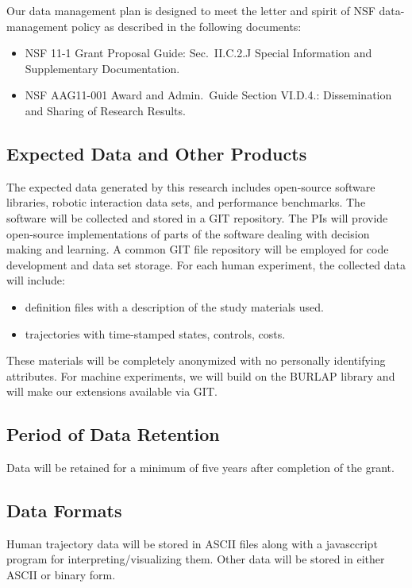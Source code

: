 Our data management plan is designed to meet the letter and spirit of
NSF data-management policy as described in the following documents:
\begin{itemize}
\item NSF 11-1 Grant Proposal Guide: Sec.\ II.C.2.J Special Information
   and Supplementary Documentation.
\item NSF AAG11-001 Award and Admin.\ Guide Section VI.D.4.: Dissemination
   and Sharing of Research Results.
\end{itemize}

\subsection*{Expected Data and Other Products}

The expected data generated by this research includes open-source
software libraries, robotic interaction data sets, and
performance benchmarks. The software will be collected and stored in a
GIT repository.  The PIs will provide open-source implementations of
parts of the software dealing with decision making and learning.
A common GIT file repository will be employed for code development and
data set storage.
For each human experiment, the collected data will include:
\begin{itemize}
\item definition files with a description of the study materials used.
\item trajectories with time-stamped states, controls, costs.
\end{itemize}
These materials will be completely anonymized with no personally
identifying attributes.
For machine experiments, we will build on the BURLAP library and will
make our extensions available via GIT.

\subsection*{Period of Data Retention}

Data will be retained for a minimum of five years after completion of
the grant.

\subsection*{Data Formats}

Human trajectory data will be stored in ASCII files along with a
javasccript program for interpreting/visualizing them.
Other data will be stored in either ASCII or binary form.

